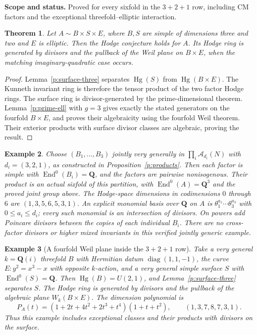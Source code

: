 \documentclass[11pt,reqno]{article}
\theoremstyle{emphasizedplain}
\newtheorem{theorem}{Theorem}[section]
\theoremstyle{emphasizeddefinition}
\newtheorem{example}[theorem]{Example}
\theoremstyle{emphasizeddefinition}
\DeclareMathOperator{\End}{End}
\DeclareMathOperator{\Hg}{Hg}
\newcommand{\Q}{\mathbf Q}
\newcommand{\status}[1]{%
  \par\nobreak\smallskip\noindent
  {\setlength{\fboxsep}{7pt}%
   \colorbox{ScopeBackground}{%
    \parbox{\dimexpr\linewidth-2\fboxsep\relax}{%
     \small\textbf{\textcolor{HeadingInk}{Scope and status.}} #1}}}%
  \par\nobreak\medskip}
\begin{document}
\status{Proved for every sixfold in the $3+2+1$ row, including CM
factors and the exceptional threefold--elliptic interaction.}
\begin{theorem}
Let $A\sim B\times S\times E$, where $B,S$ are simple of dimensions
three and two and $E$ is elliptic. Then the Hodge conjecture holds for $A$.
Its Hodge ring is generated by divisors and the pullback of the Weil
plane on $B\times E$, when the matching imaginary-quadratic case occurs.
\end{theorem}
\begin{proof}
Lemma~\ref{p:surface-three} separates $\Hg(S)$ from $\Hg(B\times E)$.
The Kunneth invariant ring is therefore the tensor product of the two
factor Hodge rings. The surface ring is divisor-generated by the
prime-dimensional theorem. Lemma~\ref{p:prime-ell} with $g=3$ gives
exactly the stated generators on the fourfold $B\times E$, and proves
their algebraicity using the fourfold Weil theorem. Their exterior
products with surface divisor classes are algebraic, proving the result.
\end{proof}
\begin{example}
Choose $(B_1,\ldots,B_{3})$ jointly very generally in
$\prod_i\mathcal A_{d_i}(N)$ with $d_i=(3,2,1)$,
as constructed in Proposition~\ref{p:products}. Then each factor is
simple with $\End^0(B_i)=\Q$, and the factors are pairwise nonisogenous.
Their product is an actual sixfold of this partition, with
$\End^0(A)=\Q^{3}$ and the proved joint group above.
The Hodge-space dimensions in codimensions $0$ through $6$ are
$(1,3,5,6,5,3,1)$.
An explicit monomial basis over $\Q$ on $A$ is
$\theta_1^{a_1}\cdots\theta_{3}^{a_{3}}$ with
$0\leq a_i\leq d_i$; every such monomial is an intersection of divisors.
On powers add Poincare divisors between the copies of each individual
$B_i$. There are no cross-factor divisors or higher mixed invariants in
this verified jointly generic example.
\end{example}
\begin{example}[A fourfold Weil plane inside the $3+2+1$ row]\label{ex:N5weil}
Take a very general $k=\Q(i)$ threefold $B$ with Hermitian datum
$\operatorname{diag}(1,1,-1)$, the curve $E:y^2=x^3-x$ with opposite
$k$-action, and a very general simple surface $S$ with $\End^0(S)=\Q$.
Then $\Hg(B)=U(2,1)$, and Lemma~\ref{p:surface-three} separates $S$.
The Hodge ring is generated by divisors and the pullback of the
algebraic plane $W_k(B\times E)$. The dimension polynomial is
\[
 P_A(t)=(1+2t+4t^2+2t^3+t^4)(1+t+t^2),
 \qquad (1,3,7,8,7,3,1).
\]
Thus this example includes exceptional classes and their products
with divisors on the surface.
\end{example}
\end{document}

